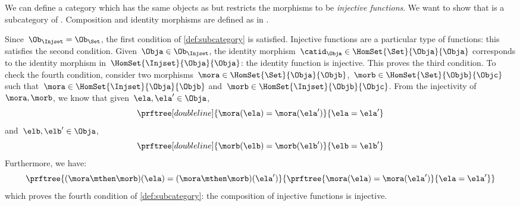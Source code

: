 \begin{example}
    \label{ex:Injset}
    We can define a category \iindex{\Injset} which has the same objects as \Set but restricts the morphisms to be \emph{injective functions}.
    We want to show that \Injset is a subcategory of \Set.
    Composition and identity morphisms are defined as in \Set.

    Since~$\Ob_{\Injset}=\Ob_{\Set}$, the first condition of \cref{def:subcategory} is satisfied.
    Injective functions are a particular type of functions: this satisfies the second condition.
    Given~$\Obja\in \Ob_{\Injset}$, the identity morphism~$\catid_\Obja\in \HomSet{\Set}{\Obja}{\Obja}$ corresponds to the identity morphism in~$\HomSet{\Injset}{\Obja}{\Obja}$:
    the identity function is injective.
    This proves the third condition.
    To check the fourth condition, consider two morphisms~$\mora \in \HomSet{\Set}{\Obja}{\Objb}$,~$\morb \in \HomSet{\Set}{\Objb}{\Objc}$ such that~$\mora \in \HomSet{\Injset}{\Obja}{\Objb}$ and~$\morb\in \HomSet{\Injset}{\Objb}{\Objc}$.
    From the injectivity of~$\mora,\morb$, we know that given~$\ela,\ela'\in \Obja$,
    \begin{equation*}
        \prftree[double line]{\mora(\ela)=\mora(\ela')}{\ela=\ela'}
    \end{equation*}
    and~$\elb,\elb'\in \Obja$,
    \begin{equation*}
        \prftree[double line]{\morb(\elb)=\morb(\elb')}{\elb=\elb'}
    \end{equation*}
    Furthermore, we have:
    \begin{equation*}
        \prftree{(\mora \mthen \morb)(\ela)
            =(\mora \mthen \morb)(\ela')}{\prftree{\mora(\ela)=\mora(\ela')}{\ela=\ela'}}
    \end{equation*}
    which proves the fourth condition of \cref{def:subcategory}: the composition of injective functions is injective.
\end{example}


